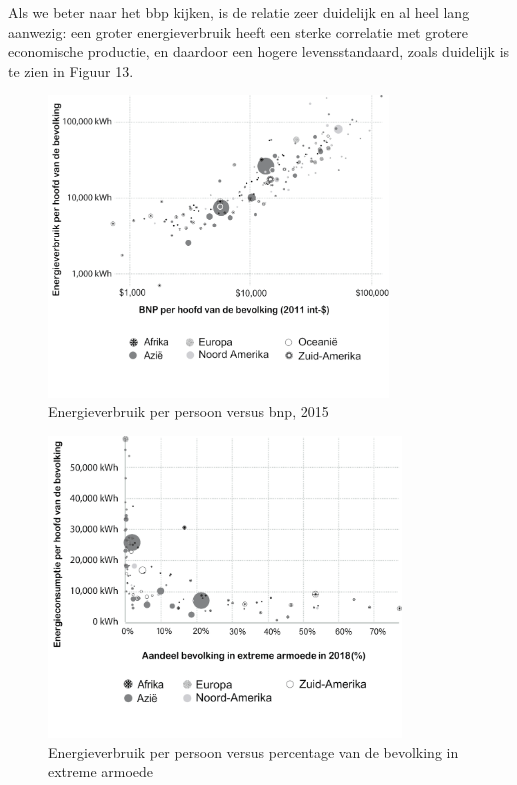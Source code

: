 Als we beter naar het bbp kijken, is de relatie zeer duidelijk en al heel lang aanwezig: een groter energieverbruik heeft een sterke correlatie met grotere economische productie, en daardoor een hogere levensstandaard, zoals duidelijk is te zien in Figuur 13.

\begin{figure}[H]
\centering
    \includegraphics[height=8cm]{figures/fig13-1.png}
    \caption[Energieverbruik per persoon versus bnp, 2015]{Energieverbruik per persoon versus bnp, 2015\footnotemark}
    \label{fig12}
\end{figure}

\begin{figure}[H]
\centering
    \includegraphics[height=8cm]{figures/fig14-1.png}
    \caption[Energieverbruik per persoon versus percentage van de bevolking in extreme armoede]{Energieverbruik per persoon versus percentage van de bevolking in extreme armoede\footnotemark}
    \label{fig12}
\end{figure}

